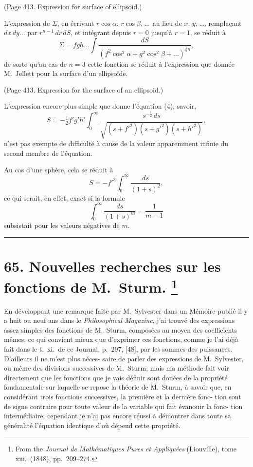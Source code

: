 \documentclass[11pt,a4paper]{article}
\theoremstyle{plain}
\theoremstyle{definition}
\begin{document}
(Page 413. Expression for surface of ellipsoid.)

L'expression de $\Sigma$, en \'{e}crivant $r\cos\alpha$, $r\cos\beta$, \ldots\ au lieu de $x$, $y$, \ldots, rempla\c{c}ant
$dx\,dy\ldots$ par $r^{n-1}\,dr\,dS$, et int\'{e}grant depuis $r = 0$ jusqu'\`{a} $r = 1$, se r\'{e}duit \`{a}
\[
\Sigma = fgh\ldots \int \frac{dS}{(f^2\cos^2\alpha + g^2\cos^2\beta + \ldots)^{\frac{1}{2}n}}, \tag{15}
\]
de sorte qu'au cas de $n = 3$ cette fonction se r\'{e}duit \`{a} l'expression que donn\'{e}e
M.~Jellett pour la surface d'un ellipso\"{i}de.

(Page 413. Expression for the surface of an ellipsoid.)

L'expression encore plus simple que donne l'\'{e}quation (4), savoir,
\[
S = -\tfrac{1}{2}f'g'h' \int_0^\infty \frac{s^{-\frac{1}{2}}\,ds}{\sqrt{(s+f'^2)(s+g'^2)(s+h'^2)}}, \tag{17}
\]
n'est pas exempte de difficult\'{e} \`{a} cause de la valeur apparemment infinie du second
membre de l'\'{e}quation.

Au cas d'une sph\`{e}re, cela se r\'{e}duit \`{a}
\[
S = -f'^3 \int_0^\infty \frac{ds}{(1+s)^2},
\]
ce qui serait, en effet, exact si la formule
\[
\int_0^\infty \frac{ds}{(1+s)^m} = \frac{1}{m-1}
\]
subsistait pour les valeurs n\'{e}gatives de $m$.

\bigskip
\hrule
\bigskip

\newpage
\section[Nouvelles recherches sur les fonctions de M.~Sturm]{%
65. Nouvelles recherches sur les fonctions de M.~Sturm.%
\footnote{From the \textit{Journal de Math\'{e}matiques Pures et Appliqu\'{e}es} (Liouville), tome xiii.\ (1848), pp.~209--274.}}

En d\'{e}veloppant une remarque faite par M.~Sylvester dans un M\'{e}moire publi\'{e} il y
a huit ou neuf ans dans le \textit{Philosophical Magazine}, j'ai trouv\'{e} des expressions assez
simples des fonctions de M.~Sturm, compos\'{e}es au moyen des coefficients m\^{e}mes; ce qui
convient mieux que d'exprimer ces fonctions, comme je l'ai d\'{e}j\`{a} fait dans le t.~xi.\ de
ce Journal, p.~297, [48], par les sommes des puissances. D'ailleurs il ne m'est plus n\'{e}ces-
saire de parler des expressions de M.~Sylvester, ou m\^{e}me des divisions successives de
M.~Sturm; mais ma m\'{e}thode fait voir directement que les fonctions que je vais d\'{e}finir
sont dou\'{e}es de la propri\'{e}t\'{e} fondamentale sur laquelle se repose la th\'{e}orie de M.~Sturm,
\`{a} savoir que, en consid\'{e}rant trois fonctions successives, la premi\`{e}re et la derni\`{e}re fonc-
tion sont de signe contraire pour toute valeur de la variable qui fait \'{e}vanouir la fonc-
tion interm\'{e}diaire; cependant je n'ai pas encore r\'{e}ussi \`{a} d\'{e}montrer dans toute sa
g\'{e}n\'{e}ralit\'{e} l'\'{e}quation identique d'o\`{u} d\'{e}pend cette propri\'{e}t\'{e}.
\end{document}
